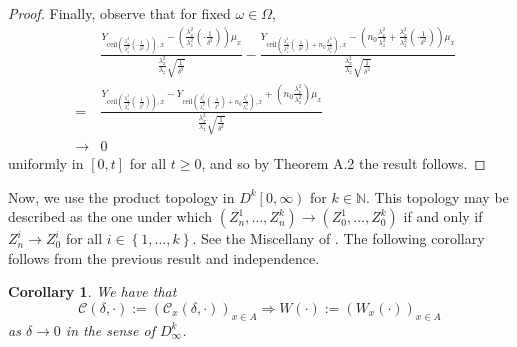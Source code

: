 \documentclass{wscpaperproc}
\theoremstyle{wsc}
\newtheorem{corollary}{Corollary}
\begin{document}
\begin{proof}
Finally, observe that for fixed $\omega\in\Omega$,
\begin{eqnarray*}
 &  & \frac{Y_{\mbox{ceil}\left(\frac{\lambda_{x}^{2}}{\lambda_{z}^{2}}\left(\cdot\frac{1}{\delta^{2}}\right)\right),x}-\mbox{}\left(\frac{\lambda_{x}^{2}}{\lambda_{z}^{2}}\left(\cdot\frac{1}{\delta^{2}}\right)\right)\mu_{x}}{\frac{\lambda_{x}^{2}}{\lambda_{z}}\sqrt{\frac{1}{\delta^{2}}}}-\frac{Y_{\mbox{ceil}\left(\frac{\lambda_{x}^{2}}{\lambda_{z}^{2}}\left(\cdot\frac{1}{\delta^{2}}\right)+n_{0}\frac{\lambda_{x}^{2}}{\lambda_{z}^{2}}\right),x}-\mbox{}\left(n_{0}\frac{\lambda_{x}^{2}}{\lambda_{z}^{2}}+\frac{\lambda_{x}^{2}}{\lambda_{z}^{2}}\left(\cdot\frac{1}{\delta^{2}}\right)\right)\mu_{x}}{\frac{\lambda_{x}^{2}}{\lambda_{z}}\sqrt{\frac{1}{\delta^{2}}}}\\
 & = & \frac{Y_{\mbox{ceil}\left(\frac{\lambda_{x}^{2}}{\lambda_{z}^{2}}\left(\cdot\frac{1}{\delta^{2}}\right)\right),x}-Y_{\mbox{ceil}\left(\frac{\lambda_{x}^{2}}{\lambda_{z}^{2}}\left(\cdot\frac{1}{\delta^{2}}\right)+n_{0}\frac{\lambda_{x}^{2}}{\lambda_{z}^{2}}\right),x}+\left(n_{0}\frac{\lambda_{x}^{2}}{\lambda_{z}^{2}}\right)\mu_{x}}{\frac{\lambda_{x}^{2}}{\lambda_{z}}\sqrt{\frac{1}{\delta^{2}}}}\\
 & \rightarrow & 0
\end{eqnarray*}
uniformly in $\left[0,t\right]$ for all $t\geq0$, and so by Theorem
A.2 the result follows.

\end{proof}


Now, we use the product topology in $D^{k}\left[0,\infty\right)$
for $k\in\mathbb{N}$. This topology may be described as the one under
which $\left(Z_{n}^{1},\ldots,Z_{n}^{k}\right)\rightarrow\left(Z_{0}^{1},\ldots,Z_{0}^{k}\right)$
if and only if $Z_{n}^{i}\rightarrow Z_{0}^{i}$ for all $i\in\left\{ 1,\ldots,k\right\} $.
See the Miscellany of  . The following corollary follows
from the previous result and independence.

\vspace{5mm}

\begin{corollary}
    \label{cor:CLT}
We have that
\[
\mathcal{C}\left(\delta,\cdot\right):=\left(\mathcal{C}_{x}\left(\delta,\cdot\right)\right)_{x\in A}\Rightarrow W\left(\cdot\right):=\left(W_{x}\left(\cdot\right)\right)_{x\in A}
\]
as $\delta\rightarrow0$ in the sense of $D_{\infty}^{k}$.
\end{corollary}

\vspace{5mm}
\end{document}
